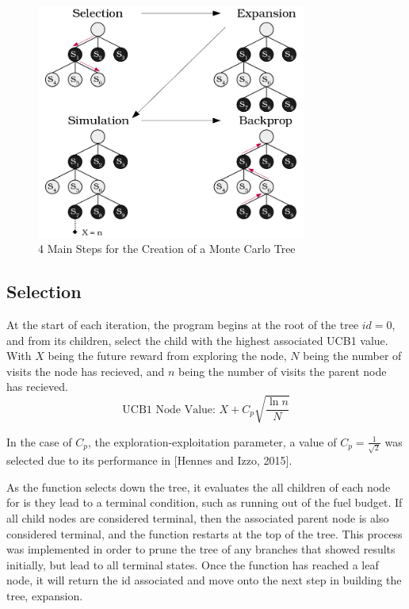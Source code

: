 \documentclass[letterpaper, preprint, paper,11pt]{AAS}	%
\begin{document}
\begin{figure}[htb]
	\centering\includegraphics[width=3.5in]{fig/mctsFuncs.png}
	\caption{4 Main Steps for the Creation of a Monte Carlo Tree}
	\label{fig:mctsFunc}
\end{figure}

\subsection{Selection} 
At the start of each iteration, the program begins at the root of the tree $id = 0$, and from its children, select the child with the highest associated UCB1 value. With $X$ being the future reward from exploring the node, $N$ being the number of visits the node has recieved, and $n$ being the number of visits the parent node has recieved. 
\begin{equation*}
    \text{UCB1 Node Value: } X + C_p \sqrt{\frac{\ln{n}}{N}}
\end{equation*}

In the case of $C_p$, the exploration-exploitation parameter, a value of $C_p = \frac{1}{\sqrt{2}}$ was selected due to its performance in [Hennes and Izzo, 2015]. 

As the function selects down the tree, it evaluates the all children of each node for is they lead to a terminal condition, such as running out of the fuel budget. If all child nodes are considered terminal, then the associated parent node is also considered terminal, and the function restarts at the top of the tree. This process was implemented in order to prune the tree of any branches that showed results initially, but lead to all terminal states. Once the function has reached a leaf node, it will return the id associated and move onto the next step in building the tree, expansion.
\end{document}
